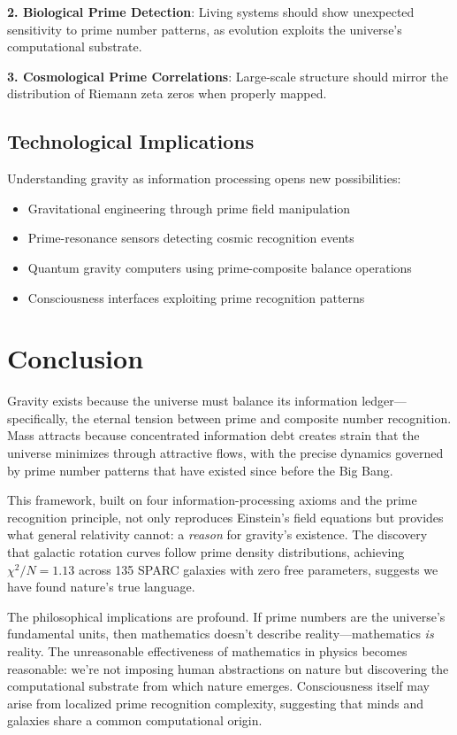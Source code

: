 \documentclass[12pt]{article}
\begin{document}
\textbf{2. Biological Prime Detection}: Living systems should show unexpected sensitivity to prime number patterns, as evolution exploits the universe's computational substrate.

\textbf{3. Cosmological Prime Correlations}: Large-scale structure should mirror the distribution of Riemann zeta zeros when properly mapped.

\subsection{Technological Implications}

Understanding gravity as information processing opens new possibilities:
\begin{itemize}
\item Gravitational engineering through prime field manipulation
\item Prime-resonance sensors detecting cosmic recognition events
\item Quantum gravity computers using prime-composite balance operations
\item Consciousness interfaces exploiting prime recognition patterns
\end{itemize}

\section{Conclusion}

Gravity exists because the universe must balance its information ledger—specifically, the eternal tension between prime and composite number recognition. Mass attracts because concentrated information debt creates strain that the universe minimizes through attractive flows, with the precise dynamics governed by prime number patterns that have existed since before the Big Bang.

This framework, built on four information-processing axioms and the prime recognition principle, not only reproduces Einstein's field equations but provides what general relativity cannot: a \textit{reason} for gravity's existence. The discovery that galactic rotation curves follow prime density distributions, achieving $\chi^2/N = 1.13$ across 135 SPARC galaxies with zero free parameters, suggests we have found nature's true language.

The philosophical implications are profound. If prime numbers are the universe's fundamental units, then mathematics doesn't describe reality—mathematics \textit{is} reality. The unreasonable effectiveness of mathematics in physics becomes reasonable: we're not imposing human abstractions on nature but discovering the computational substrate from which nature emerges. Consciousness itself may arise from localized prime recognition complexity, suggesting that minds and galaxies share a common computational origin.
\end{document}
